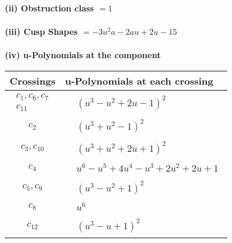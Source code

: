 \documentclass[1p]{elsarticle_modified}
\theoremstyle{definition}
\begin{document}
\flushleft \textbf{(ii) Obstruction class $= 1$}\\~\\
\flushleft \textbf{(iii) Cusp Shapes $= -3 u^2 a-2 a u+2 u-15$}\\~\\
\newpage\renewcommand{\arraystretch}{1}
\flushleft \textbf{(iv) u-Polynomials at the component}\newline \\
\begin{tabular}{m{50pt}|m{274pt}}
Crossings & \hspace{64pt}u-Polynomials at each crossing \\
\hline $$\begin{aligned}c_{1},c_{6},c_{7}\\c_{11}\end{aligned}$$&$\begin{aligned}
&(u^3- u^2+2 u-1)^2
\end{aligned}$\\
\hline $$\begin{aligned}c_{2}\end{aligned}$$&$\begin{aligned}
&(u^3+u^2-1)^2
\end{aligned}$\\
\hline $$\begin{aligned}c_{3},c_{10}\end{aligned}$$&$\begin{aligned}
&(u^3+u^2+2 u+1)^2
\end{aligned}$\\
\hline $$\begin{aligned}c_{4}\end{aligned}$$&$\begin{aligned}
&u^6- u^5+4 u^4- u^3+2 u^2+2 u+1
\end{aligned}$\\
\hline $$\begin{aligned}c_{5},c_{9}\end{aligned}$$&$\begin{aligned}
&(u^3- u^2+1)^2
\end{aligned}$\\
\hline $$\begin{aligned}c_{8}\end{aligned}$$&$\begin{aligned}
&u^6
\end{aligned}$\\
\hline $$\begin{aligned}c_{12}\end{aligned}$$&$\begin{aligned}
&(u^3- u+1)^2
\end{aligned}$\\
\hline
\end{tabular}\\~\\
\end{document}
